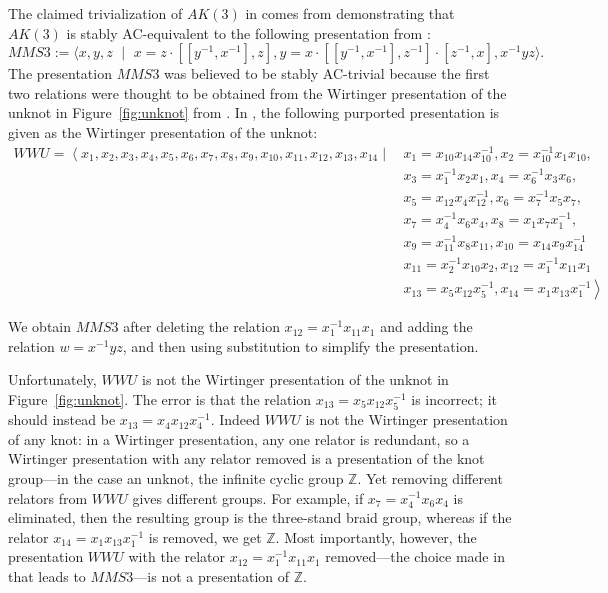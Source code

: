 
The claimed trivialization of $AK(3)$ in \cite{shehper2024makesmathproblemshard} comes from demonstrating that $AK(3)$ is stably AC-equivalent to the following presentation from \cite{myasnikov2003andrewscurtisequivalence}:
\[
MMS3 := \langle x,y,z \,\, \mid \,\, x=z\cdot [[y^{-1},x^{-1}],z], y=x\cdot [[y^{-1},x^{-1}],z^{-1}]\cdot [z^{-1},x], x^{-1}yz\rangle.
\] 
The presentation $MMS3$ was believed to be stably AC-trivial because the first two relations were thought to be obtained from the Wirtinger presentation of the unknot in Figure~\ref{fig:unknot} from \cite{myasnikov2003andrewscurtisequivalence}. In \cite{myasnikov2003andrewscurtisequivalence}, the following purported presentation is given as the Wirtinger presentation of the unknot:
\[
\begin{aligned}
WWU=\left\langle x_1, x_2, x_3, x_4, x_5, x_6, x_7, x_8, x_9, x_{10}, x_{11}, x_{12}, x_{13}, x_{14} \right. \mid\, &x_1=x_{10} x_{14} x_{10}^{-1}, x_2=x_{10}^{-1} x_1 x_{10},\\
&x_3=x_1^{-1} x_2 x_1, x_4=x_6^{-1} x_3 x_6,\\
&x_5=x_{12} x_4 x_{12}^{-1},x_6=x_7^{-1} x_5 x_7, \\
&x_7=x_4^{-1} x_6 x_4, x_8= x_1 x_7 x_1^{-1}, \\
&x_9=x_{11}^{-1} x_8 x_{11}, x_{10}=x_{14} x_9 x_{14}^{-1} \\
&x_{11}=x_2^{-1} x_{10} x_2, x_{12}=x_1^{-1} x_{11} x_1 \\
& x_{13}=x_5 x_{12} x_5^{-1}, x_{14}=x_1 x_{13} x_1^{-1}\left. \right\rangle
\end{aligned}
\]

We obtain $MMS3$ after deleting the relation $x_{12}=x_1^{-1}x_{11}x_{1}$ and adding the relation $w=x^{-1}yz$, and then using substitution to simplify the presentation. 

Unfortunately, $WWU$ is not the Wirtinger presentation of the unknot in Figure~\ref{fig:unknot}. The error is that the relation $x_{13}=x_5 x_{12} x_5^{-1}$ is incorrect; it should instead be $x_{13}=x_4 x_{12} x_4^{-1}$. Indeed $WWU$ is not the Wirtinger presentation of any knot: in a Wirtinger presentation, any one relator is redundant, so a Wirtinger presentation with any relator removed is a presentation of the knot group—in the case an unknot, the infinite cyclic group $\mathbb{Z}$. Yet removing different relators from $WWU$ gives different groups. For example, if $x_7=x_4^{-1} x_6 x_4$ is eliminated, then the resulting group is the three-stand braid group, whereas if the relator $x_{14}=x_1 x_{13} x_1^{-1}$ is removed, we get $\mathbb{Z}$. Most importantly, however, the presentation $WWU$ with the relator $x_{12}=x_1^{-1}x_{11}x_1$ removed—the choice made in \cite{myasnikov2003andrewscurtisequivalence} that leads to $MMS3$—is not a presentation of $\mathbb{Z}$. 

